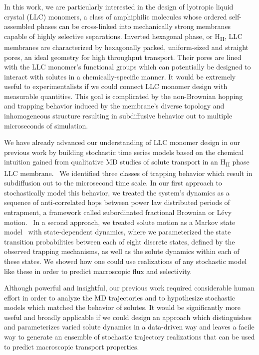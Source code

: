 \documentclass[journal=jpcbfk,manuscript=article]{achemso}
\begin{document}
  In this work, we are particularly interested in the design of lyotropic liquid 
  crystal (LLC) monomers, a class of amphiphilic molecules whose ordered self-assembled
  phases can be cross-linked into mechanically strong membranes capable of highly 
  selective separations. Inverted hexagonal phase, or H\textsubscript{II}, LLC membranes
  are characterized by hexagonally packed, uniform-sized and straight pores, an ideal
  geometry for high throughput transport. Their pores are lined with the LLC monomer's
  functional groups which can potentially be designed to interact with solutes in a 
  chemically-specific manner. It would be extremely useful to experimentalists if we 
  could connect LLC monomer design with measurable quantities. This goal is complicated
  by the non-Brownian hopping and trapping behavior induced by the membrane's diverse
  topology and inhomogeneous structure resulting in subdiffusive behavior out to 
  multiple microseconds of simulation.~\cite{coscia_understanding_2019,coscia_chemically_2019}

  We have already advanced our understanding of LLC monomer design in our previous work
  by building stochastic time series models based on the chemical intuition gained
  from qualitative MD studies of solute transport in an H\textsubscript{II} phase LLC
  membrane.~\cite{coscia_chemically_2019,coscia_capturing_2020} We identified three 
  classes of trapping behavior which result in subdiffusion out to the microsecond 
  time scale. In our first approach to stochastically model this behavior, we treated 
  the system's dynamics as a sequence of anti-correlated hops between power law distributed periods of 
  entrapment, a framework called subordinated fractional Brownian or L\'evy
  motion.~\cite{thiel_weak_2014,teuerle_modeling_2013} In a second approach, we treated 
  solute motion as a Markov state model~\cite{pande_everything_2010} with state-dependent
  dynamics, where we parameterized the state transition probabilities between each of
  eight discrete states, defined by the observed trapping mechanisms, as well as the 
  solute dynamics within each of these states. We showed how one could use realizations
  of any stochastic model like these in order to predict macroscopic flux and selectivity. 
  
  Although powerful and insightful, our previous work required considerable human effort
  in order to analyze the MD trajectories and to hypothesize stochastic models which
  matched the behavior of solutes. It would be significantly more useful and broadly 
  applicable if we could design an approach which distinguishes and parameterizes varied
  solute dynamics in a data-driven way and leaves a facile way to generate an ensemble
  of stochastic trajectory realizations that can be used to predict macroscopic transport
  properties.
  
\end{document}
